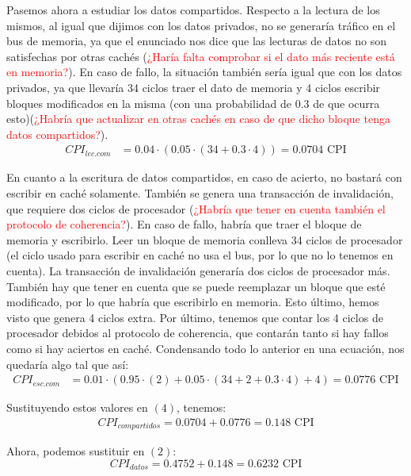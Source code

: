\documentclass[12pt,a4paper]{article}
\begin{document}
Pasemos ahora a estudiar los datos compartidos. Respecto a la lectura de los mismos, al igual que dijimos con los datos privados, no se generaría tráfico en el bus de memoria, ya que el enunciado nos dice que las lecturas de datos no son satisfechas por otras cachés (\textcolor{red}{¿Haría falta comprobar si el dato más reciente está en memoria?}). En caso de fallo, la situación también sería igual que con los datos privados, ya que llevaría 34 ciclos traer el dato de memoria y 4 ciclos escribir bloques modificados en la misma (con una probabilidad de 0.3 de que ocurra esto)(\textcolor{red}{¿Habría que actualizar en otras cachés en caso de que dicho bloque tenga datos compartidos?}).
\begin{align*}
CPI_{lec.com}&=0.04\cdot (0.05\cdot (34 + 0.3\cdot 4))=0.0704\text{ CPI}
\end{align*}

En cuanto a la escritura de datos compartidos, en caso de acierto, no bastará con escribir en caché solamente. También se genera una transacción de invalidación, que requiere dos ciclos de procesador (\textcolor{red}{¿Habría que tener en cuenta también el protocolo de coherencia?}). En caso de fallo, habría que traer el bloque de memoria y escribirlo. Leer un bloque de memoria conlleva 34 ciclos de procesador (el ciclo usado para escribir en caché no usa el bus, por lo que no lo tenemos en cuenta). La transacción de invalidación generaría dos ciclos de procesador más. También hay que tener en cuenta que se puede reemplazar un bloque que esté modificado, por lo que habría que escribirlo en memoria. Esto último, hemos visto que genera 4 ciclos extra. Por último, tenemos que contar los 4 ciclos de procesador debidos al protocolo de coherencia, que contarán tanto si hay fallos como si hay aciertos en caché. Condensando todo lo anterior en una ecuación, nos quedaría algo tal que así:
\begin{align*}
CPI_{esc.com}&=0.01\cdot (0.95\cdot (2) + 0.05\cdot (34+2+0.3\cdot 4)+4)=0.0776\text{ CPI}
\end{align*}

Sustituyendo estos valores en $(4)$, tenemos:
\begin{align*}
CPI_{compartidos}=0.0704+0.0776=0.148 \text{ CPI}
\end{align*}

Ahora, podemos sustituir en $(2)$:
\begin{equation*}
CPI_{datos}=0.4752+0.148=0.6232\text{ CPI}
\end{equation*}
\end{document}
